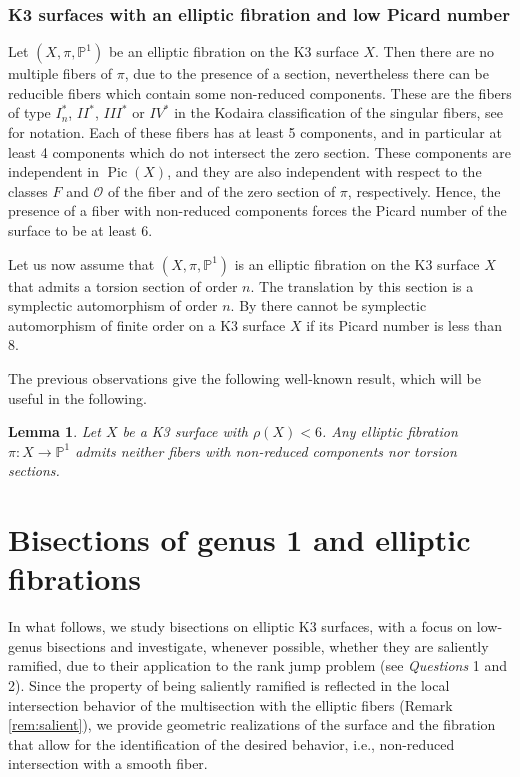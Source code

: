 \documentclass{amsart}
\newtheorem{lemma}[theorem]{Lemma}
\theoremstyle{definition}
\numberwithin{equation}{section}
\newcommand{\ra}{\rightarrow}
\DeclareMathOperator{\Pic}{Pic}
\begin{document}
\subsubsection{K3 surfaces with an elliptic fibration and low Picard number}\label{subsubsec: K3 low Picard}
Let $(X,\pi,\mathbb{P}^1)$ be an elliptic fibration on the K3 surface $X$. Then there are no multiple fibers of $\pi$, due to the presence of a section, nevertheless there can be reducible fibers which contain some non-reduced components. These are the fibers of type $I_n^*$, $II^*$, $III^*$ or $IV^*$ in the Kodaira classification of the singular fibers, see \cite{Mi} for notation. Each of these fibers has at least 5 components, and in particular at least 4 components which do not intersect the zero section. These components are independent in $\Pic(X)$, and they are also independent with respect to the classes $F$ and $\mathcal{O}$ of the fiber and of the zero section of $\pi$, respectively. Hence, the presence of a fiber with non-reduced components forces the Picard number of the surface to be at least 6.

Let us now assume that $(X,\pi,\mathbb{P}^1)$ is an elliptic fibration on the K3 surface $X$ that admits a torsion section of order $n$. The translation by this section is a symplectic automorphism of order $n$. By \cite{Nik} there cannot be symplectic automorphism of finite order on a K3 surface $X$ if its  Picard number is less than 8.

The previous observations give the following well-known result, which will be useful in the following.
\begin{lemma}\label{lemma: e.f. with small rho}
Let $X$ be a K3 surface with $\rho(X)< 6$. Any elliptic fibration $\pi:X\ra\mathbb{P}^1$ admits neither fibers with non-reduced components nor torsion sections.
\end{lemma}


\section{Bisections of genus 1 and elliptic fibrations}\label{subsec:bisections lattice}

In what follows, we study bisections on elliptic K3 surfaces, with a focus on low-genus bisections and investigate, whenever possible, whether they are saliently ramified, due to their application to the rank jump problem (see \textit{Questions} 1 and 2). Since the property of being saliently ramified is reflected in the local intersection behavior of the multisection with the elliptic fibers (Remark \ref{rem:salient}), we provide geometric realizations of the surface and the fibration that allow for the identification of the desired behavior, i.e., non-reduced intersection with a smooth fiber.
\end{document}
